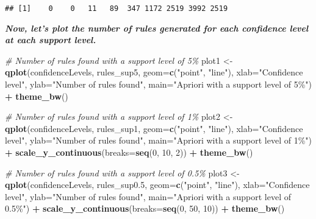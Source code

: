 \documentclass[
]{article}
\newenvironment{Shaded}{\begin{snugshade}}{\end{snugshade}}
\newcommand{\AttributeTok}[1]{\textcolor[rgb]{0.13,0.29,0.53}{#1}}
\newcommand{\CommentTok}[1]{\textcolor[rgb]{0.56,0.35,0.01}{\textit{#1}}}
\newcommand{\DecValTok}[1]{\textcolor[rgb]{0.00,0.00,0.81}{#1}}
\newcommand{\FloatTok}[1]{\textcolor[rgb]{0.00,0.00,0.81}{#1}}
\newcommand{\FunctionTok}[1]{\textcolor[rgb]{0.13,0.29,0.53}{\textbf{#1}}}
\newcommand{\NormalTok}[1]{#1}
\newcommand{\OtherTok}[1]{\textcolor[rgb]{0.56,0.35,0.01}{#1}}
\newcommand{\SpecialCharTok}[1]{\textcolor[rgb]{0.81,0.36,0.00}{\textbf{#1}}}
\newcommand{\StringTok}[1]{\textcolor[rgb]{0.31,0.60,0.02}{#1}}
\begin{document}
\begin{verbatim}
## [1]    0    0   11   89  347 1172 2519 3992 2519
\end{verbatim}

\textbf{\emph{Now, let's plot the number of rules generated for each
confidence level at each support level.}}

\begin{Shaded}
\begin{Highlighting}[]
\CommentTok{\# Number of rules found with a support level of 5\%}
\NormalTok{plot1 }\OtherTok{\textless{}{-}} \FunctionTok{qplot}\NormalTok{(confidenceLevels, rules\_sup5, }\AttributeTok{geom=}\FunctionTok{c}\NormalTok{(}\StringTok{"point"}\NormalTok{, }\StringTok{"line"}\NormalTok{), }
               \AttributeTok{xlab=}\StringTok{"Confidence level"}\NormalTok{, }\AttributeTok{ylab=}\StringTok{"Number of rules found"}\NormalTok{, }
               \AttributeTok{main=}\StringTok{"Apriori with a support level of 5\%"}\NormalTok{) }\SpecialCharTok{+}
  \FunctionTok{theme\_bw}\NormalTok{()}

\CommentTok{\# Number of rules found with a support level of 1\%}
\NormalTok{plot2 }\OtherTok{\textless{}{-}} \FunctionTok{qplot}\NormalTok{(confidenceLevels, rules\_sup1, }\AttributeTok{geom=}\FunctionTok{c}\NormalTok{(}\StringTok{"point"}\NormalTok{, }\StringTok{"line"}\NormalTok{), }
               \AttributeTok{xlab=}\StringTok{"Confidence level"}\NormalTok{, }\AttributeTok{ylab=}\StringTok{"Number of rules found"}\NormalTok{, }
               \AttributeTok{main=}\StringTok{"Apriori with a support level of 1\%"}\NormalTok{) }\SpecialCharTok{+} 
  \FunctionTok{scale\_y\_continuous}\NormalTok{(}\AttributeTok{breaks=}\FunctionTok{seq}\NormalTok{(}\DecValTok{0}\NormalTok{, }\DecValTok{10}\NormalTok{, }\DecValTok{2}\NormalTok{)) }\SpecialCharTok{+}
  \FunctionTok{theme\_bw}\NormalTok{()}

\CommentTok{\# Number of rules found with a support level of 0.5\%}
\NormalTok{plot3 }\OtherTok{\textless{}{-}} \FunctionTok{qplot}\NormalTok{(confidenceLevels, rules\_sup0}\FloatTok{.5}\NormalTok{, }\AttributeTok{geom=}\FunctionTok{c}\NormalTok{(}\StringTok{"point"}\NormalTok{, }\StringTok{"line"}\NormalTok{), }
               \AttributeTok{xlab=}\StringTok{"Confidence level"}\NormalTok{, }\AttributeTok{ylab=}\StringTok{"Number of rules found"}\NormalTok{, }
               \AttributeTok{main=}\StringTok{"Apriori with a support level of 0.5\%"}\NormalTok{) }\SpecialCharTok{+} 
  \FunctionTok{scale\_y\_continuous}\NormalTok{(}\AttributeTok{breaks=}\FunctionTok{seq}\NormalTok{(}\DecValTok{0}\NormalTok{, }\DecValTok{50}\NormalTok{, }\DecValTok{10}\NormalTok{)) }\SpecialCharTok{+}
  \FunctionTok{theme\_bw}\NormalTok{()}


\end{Highlighting}
\end{Shaded}
\end{document}
